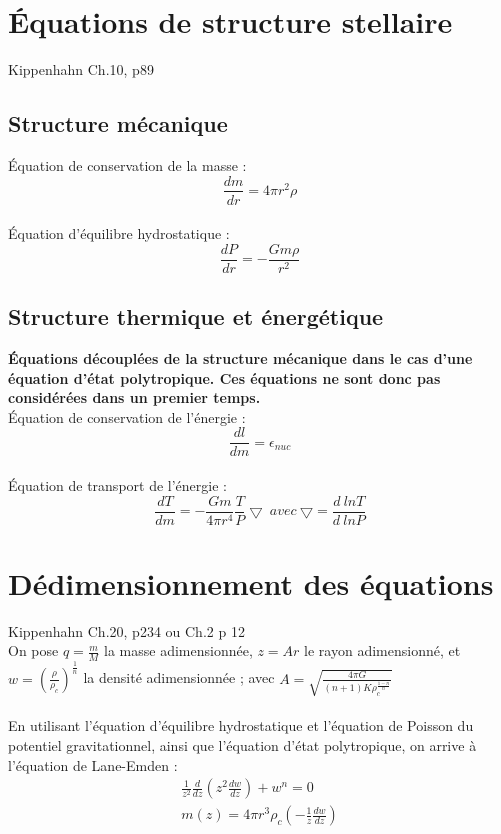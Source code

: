\documentclass[a4paper,10pt]{article}
\begin{document}
\newpage
\section{Équations de structure stellaire}
Kippenhahn Ch.10, p89
\subsection{Structure mécanique}
Équation de conservation de la masse :
\begin{equation}
\frac{d m}{d r} = 4 \pi r^2 \rho
\end{equation}
\\
Équation d'équilibre hydrostatique :
\begin{equation}
\frac{d P}{d r} = - \frac{G m \rho}{r^2}
\end{equation}
\subsection{Structure thermique et énergétique}
\textbf{Équations découplées de la structure mécanique dans le cas d'une équation d'état polytropique. Ces équations ne sont donc pas considérées dans un premier temps.}\\
Équation de conservation de l'énergie :
\begin{equation}
\frac{d l}{d m}= \epsilon_{nuc}
\end{equation}
\\
Équation de transport de l'énergie :
\begin{equation}
\frac{d T}{d m}= - \frac{G m}{4 \pi r^4} \frac{T}{P} \bigtriangledown ~ avec ~ \bigtriangledown = \frac{d~ln T}{d~ln P}
\end{equation}

\newpage

\section{Dédimensionnement des équations}
Kippenhahn Ch.20, p234 ou Ch.2 p 12\\
On pose $q=\frac{m}{M}$ la masse adimensionnée, $z=A r$ le rayon adimensionné, et $w=(\frac{\rho}{\rho_c})^{\frac{1}{n}}$ la densité adimensionnée ; avec $A=\sqrt{\frac{4 \pi G}{(n+1) K \rho_c^{\frac{1-n}{n}}}}$ \\
\\
En utilisant l'équation d'équilibre hydrostatique et l'équation de Poisson du potentiel gravitationnel, ainsi que l'équation d'état polytropique, on arrive à l'équation de Lane-Emden :\\
\begin{eqnarray}
\frac{1}{z^2}\frac{d}{dz}(z^2 \frac{d w}{dz}) + w^n=0\\
m(z)=4 \pi r^3 \rho_c \left(- \frac{1}{z} \frac{dw}{dz}\right)
\end{eqnarray}
\end{document}
